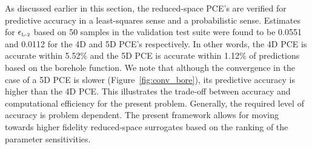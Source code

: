 As discussed earlier in this section, the reduced-space PCE's are verified for
predictive accuracy in a least-squares sense and a probabilistic sense.
Estimates for $\epsilon_{\mbox{\tiny{L-2}}}$ based on 50 samples in the
validation test suite were
found to be 0.0551 and 0.0112 for the 4D and 5D PCE's respectively. In other
words, the 4D PCE is accurate within 5.52$\%$ and the 5D PCE is accurate within
1.12$\%$ of predictions based on the borehole function. We note  that although
the convergence in the case of a 5D PCE is slower (Figure~\ref{fig:conv_bore}),
its predictive accuracy is higher than the 4D PCE. This illustrates the
trade-off between accuracy and computational efficiency for the present 
problem. Generally, the required level of accuracy is problem dependent. 
The present framework allows for moving towards higher fidelity 
reduced-space surrogates based on the ranking of the parameter sensitivities. 
 


